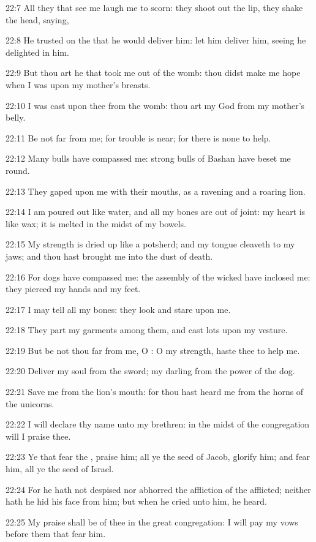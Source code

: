 22:7 All they that see me laugh me to scorn: they shoot out the lip,
they shake the head, saying,

22:8 He trusted on the \LORD that he would deliver him: let him deliver
him, seeing he delighted in him.

22:9 But thou art he that took me out of the womb: thou didst make me
hope when I was upon my mother's breasts.

22:10 I was cast upon thee from the womb: thou art my God from my
mother's belly.

22:11 Be not far from me; for trouble is near; for there is none to
help.

22:12 Many bulls have compassed me: strong bulls of Bashan have beset
me round.

22:13 They gaped upon me with their mouths, as a ravening and a
roaring lion.

22:14 I am poured out like water, and all my bones are out of joint:
my heart is like wax; it is melted in the midst of my bowels.

22:15 My strength is dried up like a potsherd; and my tongue cleaveth
to my jaws; and thou hast brought me into the dust of death.

22:16 For dogs have compassed me: the assembly of the wicked have
inclosed me: they pierced my hands and my feet.

22:17 I may tell all my bones: they look and stare upon me.

22:18 They part my garments among them, and cast lots upon my vesture.

22:19 But be not thou far from me, O \LORD: O my strength, haste thee
to help me.

22:20 Deliver my soul from the sword; my darling from the power of the
dog.

22:21 Save me from the lion's mouth: for thou hast heard me from the
horns of the unicorns.

22:22 I will declare thy name unto my brethren: in the midst of the
congregation will I praise thee.

22:23 Ye that fear the \LORD, praise him; all ye the seed of Jacob,
glorify him; and fear him, all ye the seed of Israel.

22:24 For he hath not despised nor abhorred the affliction of the
afflicted; neither hath he hid his face from him; but when he cried
unto him, he heard.

22:25 My praise shall be of thee in the great congregation: I will pay
my vows before them that fear him.

